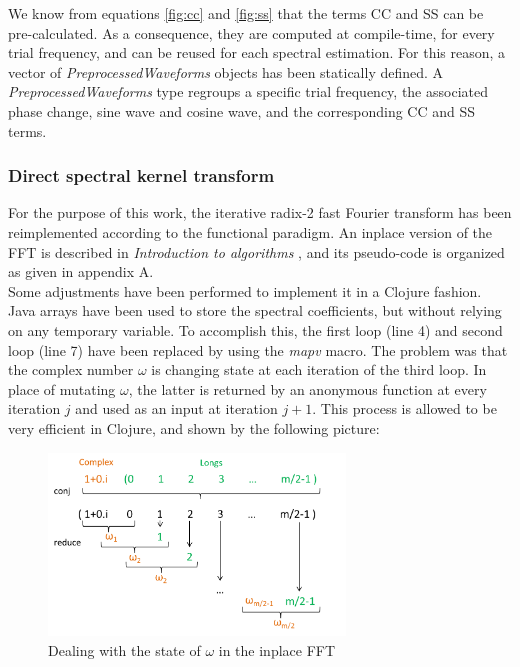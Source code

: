 \documentclass[letterpaper]{article}
\begin{document}
We know from equations \ref{fig:cc} and \ref{fig:ss} that the terms CC and SS can be pre-calculated. As a consequence, they are computed at compile-time,
for every trial frequency, and can be reused for each spectral estimation. For this reason, a vector of \textit{PreprocessedWaveforms} objects has been statically defined. A \textit{PreprocessedWaveforms}
type regroups a specific trial frequency, the associated phase change, sine wave and cosine wave, and the corresponding CC and SS terms.\\

\subsubsection{Direct spectral kernel transform}

For the purpose of this work, the iterative radix-2 fast Fourier transform has been reimplemented according to the functional paradigm. An inplace version of the FFT is described in \textit{Introduction to algorithms} \citep{FFT}, and its pseudo-code is organized as given in appendix A. \\

Some adjustments have been performed to implement it in a Clojure fashion. Java arrays have been used to store the spectral coefficients, but without relying on any temporary variable. To accomplish this, the first loop (line 4) and second loop (line 7) have been replaced by using the \textit{mapv} macro. The problem was that the complex number $\omega$ is changing state at each iteration of the third loop. In place of mutating $\omega$, the latter is returned by an anonymous function at every iteration $j$ and used as an input at iteration $j + 1$. This process is allowed to be very efficient in Clojure, and shown by the following picture:

\FloatBarrier

\begin{figure}[h!]
\begin{center}
\includegraphics[width=3.1in,angle=0]{imgs/reduceconj.png}
\caption{Dealing with the state of $\omega$ in the inplace FFT}
\label{fig3}
\end{center}
\end{figure}
\end{document}
